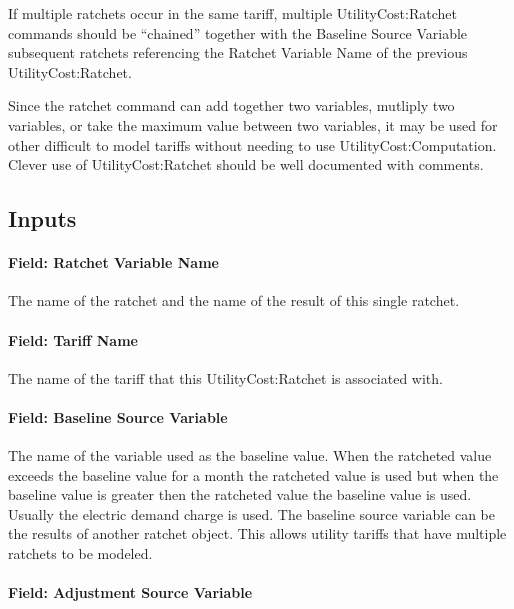 If multiple ratchets occur in the same tariff, multiple UtilityCost:Ratchet commands should be ``chained'' together with the Baseline Source Variable subsequent ratchets referencing the Ratchet Variable Name of the previous UtilityCost:Ratchet.

Since the ratchet command can add together two variables, mutliply two variables, or take the maximum value between two variables, it may be used for other difficult to model tariffs without needing to use UtilityCost:Computation. Clever use of UtilityCost:Ratchet should be well documented with comments.

\subsection{Inputs}\label{inputs-071}

\paragraph{Field: Ratchet Variable Name}\label{field-ratchet-variable-name}

The name of the ratchet and the name of the result of this single ratchet.

\paragraph{Field: Tariff Name}\label{field-tariff-name-003}

The name of the tariff that this UtilityCost:Ratchet is associated with.

\paragraph{Field: Baseline Source Variable}\label{field-baseline-source-variable}

The name of the variable used as the baseline value. When the ratcheted value exceeds the baseline value for a month the ratcheted value is used but when the baseline value is greater then the ratcheted value the baseline value is used. Usually the electric demand charge is used. The baseline source variable can be the results of another ratchet object. This allows utility tariffs that have multiple ratchets to be modeled.

\paragraph{Field: Adjustment Source Variable}\label{field-adjustment-source-variable}

